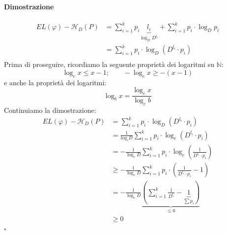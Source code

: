 \paragraph{Dimostrazione} 
\begin{align*}
    EL(\varphi)-\mathcal{H}_D(P) &= \sum_{i=1}^k p_i\underbrace{l_i}_{\log_DD^{l_i}} + \sum_{i=1}^k p_i\cdot\log_Dp_i\\
    &= \sum_{i=1}^k p_i\cdot\log_D(D^{l_i}\cdot p_i)\\
\end{align*}
Prima di proseguire, ricordiamo la seguente proprietà dei logaritmi su $\mathbb{N}$:
$$
    \log_ex\leq x-1; \qquad -\log_ex\geq -(x-1) 
$$
e anche la proprietà dei logaritmi:
$$
    \log_bx = \frac{\log_cx}{\log_cb}
$$
Continuiamo la dimostrazione:
\begin{align*}
    EL(\varphi)-\mathcal{H}_D(P) &= \sum_{i=1}^k p_i\cdot\log_D(D^{l_i}\cdot p_i)\\
    &= \frac{1}{log_eD} \sum_{i=1}^k p_i\cdot\log_e(D^{l_i}\cdot p_i)\\
    &= -\frac{1}{\log_eD} \sum_{i=1}^k p_i\cdot\log_e\left(\frac{1}{D^{l_i}\cdot p_i}\right)\\
    &\geq -\frac{1}{\log_eD} \sum_{i=1}^k p_i\cdot\left(\frac{1}{D^{l_i}\cdot p_i}-1\right)\\
    &= -\frac{1}{\log_eD} \underbrace{\left(\sum_{i=1}^k\frac{1}{D^{l_i}}-\underbrace{1}_{\sum p_i}\right)}_{\leq 0}\\
    &\geq 0
\end{align*}
\hfill $\square$ 


